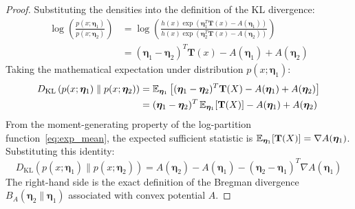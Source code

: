 \begin{proof}
Substituting the densities into the definition of the KL divergence:
\begin{align}
\log\left(\frac{p(x; \boldsymbol{\eta}_1)}{p(x; \boldsymbol{\eta}_2)}\right) &= \log\left( \frac{h(x)\exp(\boldsymbol{\eta}_1^T \mathbf{T}(x) - A(\boldsymbol{\eta}_1))}{h(x)\exp(\boldsymbol{\eta}_2^T \mathbf{T}(x) - A(\boldsymbol{\eta}_2))} \right) \nonumber \\
&= (\boldsymbol{\eta}_1 - \boldsymbol{\eta}_2)^T \mathbf{T}(x) - A(\boldsymbol{\eta}_1) + A(\boldsymbol{\eta}_2)
\end{align}
Taking the mathematical expectation under distribution $p(x; \boldsymbol{\eta}_1)$:
\begin{align}
D_{\text{KL}}\left( p(x; \boldsymbol{\eta}_1) \parallel p(x; \boldsymbol{\eta}_2) \right) &= \operatorname{\mathbb{E}}_{\boldsymbol{\eta}_1}\left[ (\boldsymbol{\eta}_1 - \boldsymbol{\eta}_2)^T \mathbf{T}(X) - A(\boldsymbol{\eta}_1) + A(\boldsymbol{\eta}_2) \right] \nonumber \\
&= (\boldsymbol{\eta}_1 - \boldsymbol{\eta}_2)^T \operatorname{\mathbb{E}}_{\boldsymbol{\eta}_1}[\mathbf{T}(X)] - A(\boldsymbol{\eta}_1) + A(\boldsymbol{\eta}_2)
\end{align}
From the moment-generating property of the log-partition function~\eqref{eq:exp_mean}, the expected sufficient statistic is $\operatorname{\mathbb{E}}_{\boldsymbol{\eta}_1}[\mathbf{T}(X)] = \nabla A(\boldsymbol{\eta}_1)$.
Substituting this identity:
\begin{equation}
D_{\text{KL}}\left( p(x; \boldsymbol{\eta}_1) \parallel p(x; \boldsymbol{\eta}_2) \right) = A(\boldsymbol{\eta}_2) - A(\boldsymbol{\eta}_1) - (\boldsymbol{\eta}_2 - \boldsymbol{\eta}_1)^T \nabla A(\boldsymbol{\eta}_1)
\end{equation}
The right-hand side is the exact definition of the Bregman divergence $B_A(\boldsymbol{\eta}_2 \parallel \boldsymbol{\eta}_1)$ associated with convex potential $A$.
\end{proof}

